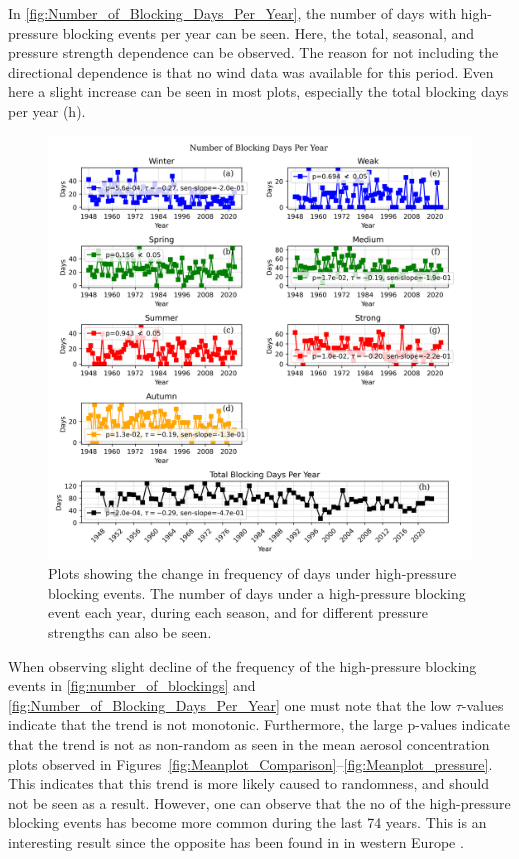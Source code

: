 In \autoref{fig:Number_of_Blocking_Days_Per_Year}, the number of days with high-pressure blocking events per year can be seen. Here, the total, seasonal, and pressure strength dependence can be observed. The reason for not including the directional dependence is that no wind data was available for this period. Even here a slight increase can be seen in most plots, especially the total blocking days per year (h). 


\begin{figure}[H]
    \centering
    \includegraphics[width=\textwidth]{Figures/blocking_days_per_year_all.png}
    \caption{Plots showing the change in frequency of days under high-pressure blocking events. The number of days under a high-pressure blocking event each year, during each season, and for different pressure strengths can also be seen.}
    \label{fig:Number_of_Blocking_Days_Per_Year}
\end{figure}

When observing slight decline of the frequency of the high-pressure blocking events in \autoref{fig:number_of_blockings} and \autoref{fig:Number_of_Blocking_Days_Per_Year} one must note that the low $\tau$-values indicate that the trend is not monotonic. Furthermore, the large p-values indicate that the trend is not as non-random as seen in the mean aerosol concentration plots observed in Figures~\ref{fig:Meanplot_Comparison}--\ref{fig:Meanplot_pressure}. This indicates that this trend is more likely caused to randomness, and should not be seen as a result. However, one can observe that the no of the high-pressure blocking events has become more common during the last 74 years. This is an interesting result since the opposite has been found in in western Europe \cite{lupoAtmosphericBlockingEvents2020}. 

